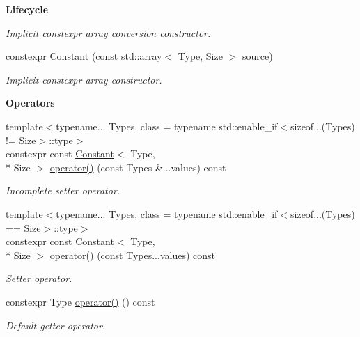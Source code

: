 \begin{Indent}{\bf Lifecycle}
\begin{DoxyCompactItemize}
\begin{DoxyCompactList}\small\item\em Implicit constexpr array conversion constructor. \end{DoxyCompactList}\item 
constexpr \hyperlink{exceptionmagrathea_1_1Constant_a2e16e68a780e7910f637ab74eb2d25e7}{Constant} (const std\-::array$<$ Type, Size $>$ source)
\begin{DoxyCompactList}\small\item\em Implicit constexpr array constructor. \end{DoxyCompactList}\end{DoxyCompactItemize}
\end{Indent}
\begin{Indent}{\bf Operators}\par
\begin{DoxyCompactItemize}
\item 
{\footnotesize template$<$typename... Types, class  = typename std\-::enable\-\_\-if$<$sizeof...(\-Types) != Size$>$\-::type$>$ }\\constexpr const \hyperlink{exceptionmagrathea_1_1Constant}{Constant}$<$ Type, \\*
Size $>$ \hyperlink{exceptionmagrathea_1_1Constant_a012b7fef543e7a4407c6348a7dab84bf}{operator()} (const Types \&...values) const 
\begin{DoxyCompactList}\small\item\em Incomplete setter operator. \end{DoxyCompactList}\item 
{\footnotesize template$<$typename... Types, class  = typename std\-::enable\-\_\-if$<$sizeof...(\-Types) == Size$>$\-::type$>$ }\\constexpr const \hyperlink{exceptionmagrathea_1_1Constant}{Constant}$<$ Type, \\*
Size $>$ \hyperlink{exceptionmagrathea_1_1Constant_a2768001408b9fdc850a6faca04d3c7f5}{operator()} (const Types...\-values) const 
\begin{DoxyCompactList}\small\item\em Setter operator. \end{DoxyCompactList}\item 
constexpr Type \hyperlink{exceptionmagrathea_1_1Constant_a110e3165961cb41b824d64be02cd6599}{operator()} () const 
\begin{DoxyCompactList}\small\item\em Default getter operator. \end{DoxyCompactList}\item 

\end{DoxyCompactItemize}
\end{Indent}
